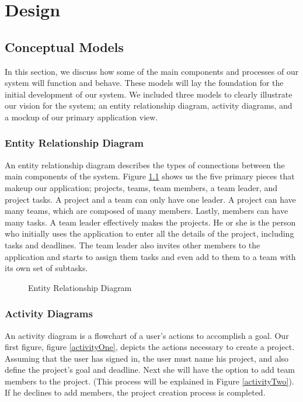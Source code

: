 \chapter{Design}

\section{Conceptual Models}
In this section, we discuss how some of the main components and processes of our system will function and behave. These models will lay the foundation for the initial development of our system. We included three models to clearly illustrate our vision for the system; an entity relationship diagram, activity diagrams, and a mockup of our primary application view.
\subsection{Entity Relationship Diagram}
An entity relationship diagram describes the types of connections between the main components of the system. Figure \ref{erd} shows us the five primary pieces that makeup our application; projects, teams, team members, a team leader, and project tasks. A project and a team can only have one leader. A project can have many teams, which are composed of many members. Lastly, members can have many tasks. 
A team leader effectively makes the projects. He or she is the person who initially uses the application to enter all the details of the project, including tasks and deadlines. The team leader also invites other members to the application and starts to assign them tasks and even add to them to a team with its own set of subtasks. 
\begin{figure}[ht]
\centering
{}
\caption{Entity Relationship Diagram}
\label{erd}
\end{figure}
\FloatBarrier

\subsection{Activity Diagrams}
An activity diagram is a flowchart of a user’s actions to accomplish a goal. Our first figure, figure \ref{activityOne}, depicts the actions necessary to create a project. Assuming that the user has signed in, the user must name his project, and also define the project’s goal and deadline. Next she will have the option to add team members to the project. (This process will be explained in Figure \ref{activityTwo}).  If he declines to add members, the project creation process is completed. 

